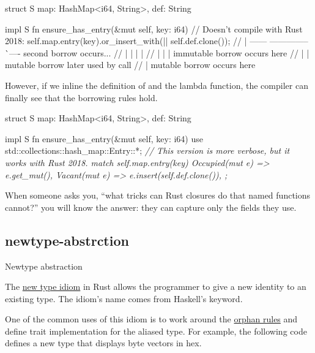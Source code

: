 \documentclass{article}
\begin{document}
\begin{code}[bad]
struct S { map: HashMap<i64, String>, def: String }

impl S {
  fn ensure_has_entry(&mut self, key: i64) {
    // Doesn't compile with Rust 2018:
    self.map.entry(key).or_insert_with(|| self.def.clone());
// |         ------            -------------- ^^ ---- second borrow occurs...
// |         |                 |              |
// |         |                 |              immutable borrow occurs here
// |         |                 mutable borrow later used by call
// |         mutable borrow occurs here
  }
}
\end{code}

However, if we inline the definition of  and the lambda function, the compiler can finally see that the borrowing rules hold.

\begin{code}[good]
struct S { map: HashMap<i64, String>, def: String }

impl S {
  fn ensure_has_entry(&mut self, key: i64) {
    use std::collections::hash_map::Entry::*;
    \em{// This version is more verbose, but it works with Rust 2018.}
    match self.map.entry(key) {
      Occupied(mut e) => e.get_mut(),
      Vacant(mut e) => e.insert(self.def.clone()),
    };
  }
}
\end{code}

When someone asks you, ``what tricks can Rust closures do that named functions cannot?'' you will know the answer: they can capture only the fields they use.

\subsection{newtype-abstrction}{Newtype abstraction}

The \href{https://doc.rust-lang.org/rust-by-example/generics/new_types.html}{new type idiom} in Rust allows the programmer to give a new identity to an existing type.
The idiom's name comes from Haskell's \href{https://wiki.haskell.org/Newtype}{} keyword.

One of the common uses of this idiom is to work around the \href{#orphan-rules}{orphan rules} and define trait implementation for the aliased type.
For example, the following code defines a new type that displays byte vectors in hex.
\end{document}

